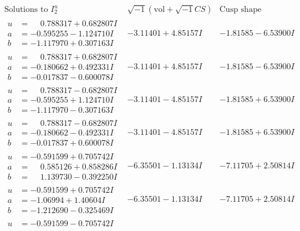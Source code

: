 \documentclass[1p]{elsarticle_modified}
\theoremstyle{definition}
\newcommand{\I}{\sqrt{-1}}
\begin{document}
$$\begin{array}{c|c|c}  
\text{Solutions to }I^u_{2}& \I (\text{vol} + \sqrt{-1}CS) & \text{Cusp shape}\\
 \hline 
\begin{aligned}
u &= \phantom{-}0.788317 + 0.682807 I \\
a &= -0.595255 - 1.124710 I \\
b &= -1.117970 + 0.307163 I\end{aligned}
 & -3.11401 + 4.85157 I & -1.81585 - 6.53900 I \\ \hline\begin{aligned}
u &= \phantom{-}0.788317 + 0.682807 I \\
a &= -0.180662 + 0.492331 I \\
b &= -0.017837 - 0.600078 I\end{aligned}
 & -3.11401 + 4.85157 I & -1.81585 - 6.53900 I \\ \hline\begin{aligned}
u &= \phantom{-}0.788317 - 0.682807 I \\
a &= -0.595255 + 1.124710 I \\
b &= -1.117970 - 0.307163 I\end{aligned}
 & -3.11401 - 4.85157 I & -1.81585 + 6.53900 I \\ \hline\begin{aligned}
u &= \phantom{-}0.788317 - 0.682807 I \\
a &= -0.180662 - 0.492331 I \\
b &= -0.017837 + 0.600078 I\end{aligned}
 & -3.11401 - 4.85157 I & -1.81585 + 6.53900 I \\ \hline\begin{aligned}
u &= -0.591599 + 0.705742 I \\
a &= \phantom{-}0.585126 + 0.858286 I \\
b &= \phantom{-}1.139730 - 0.392250 I\end{aligned}
 & -6.35501 - 1.13134 I & -7.11705 + 2.50814 I \\ \hline\begin{aligned}
u &= -0.591599 + 0.705742 I \\
a &= -1.06994 + 1.40604 I \\
b &= -1.212690 - 0.325469 I\end{aligned}
 & -6.35501 - 1.13134 I & -7.11705 + 2.50814 I \\ \hline\begin{aligned}
u &= -0.591599 - 0.705742 I \\

\end{aligned}
\end{array}$$
\end{document}
